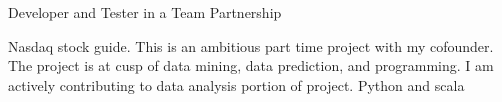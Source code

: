 \begin{cventries}
\cventry
    {Developer and Tester in a Team} %
    {} %
    {Partnership} %
    {} %
    {
      \begin{cvitems} %
        \item { Nasdaq stock guide. This is an ambitious part time project with my cofounder. The project is at cusp of data mining, data prediction, and programming. I am actively contributing to data analysis portion of project. Python and scala}
      \end{cvitems}
    }

\end{cventries}
